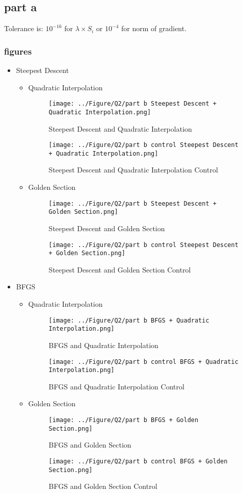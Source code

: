 \subsection{part a}
Tolerance is: $10^{-16}$ for $\lambda \times S_i$ or $10^{-4}$ for norm of gradient.
\subsubsection{figures}
\newpage
\begin{itemize}
	\item Steepest Descent
	\begin{itemize}
		\item Quadratic Interpolation
		\begin{figure}[H]
			\caption{Steepest Descent and Quadratic Interpolation}
			\centering
			\texttt{[image: ../Figure/Q2/part b Steepest Descent + Quadratic Interpolation.png]}
		\end{figure}
		\begin{figure}[H]
			\caption{Steepest Descent and Quadratic Interpolation Control}
			\centering
			\texttt{[image: ../Figure/Q2/part b control Steepest Descent + Quadratic Interpolation.png]}
		\end{figure}
		\item Golden Section
		\begin{figure}[H]
			\caption{Steepest Descent and Golden Section}
			\centering
			\texttt{[image: ../Figure/Q2/part b Steepest Descent + Golden Section.png]}
		\end{figure}
		\begin{figure}[H]
			\caption{Steepest Descent and Golden Section Control}
			\centering
			\texttt{[image: ../Figure/Q2/part b control Steepest Descent + Golden Section.png]}
		\end{figure}
	\end{itemize}
	\item BFGS
	\begin{itemize}
		\item Quadratic Interpolation
		\begin{figure}[H]
			\caption{BFGS and Quadratic Interpolation}
			\centering
			\texttt{[image: ../Figure/Q2/part b BFGS + Quadratic Interpolation.png]}
		\end{figure}
			\begin{figure}[H]
		\caption{BFGS and Quadratic Interpolation Control}
		\centering
		\texttt{[image: ../Figure/Q2/part b control BFGS + Quadratic Interpolation.png]}
	\end{figure}
		\item Golden Section
		\begin{figure}[H]
			\caption{BFGS and Golden Section}
			\centering
			\texttt{[image: ../Figure/Q2/part b BFGS + Golden Section.png]}
		\end{figure}
			\begin{figure}[H]
		\caption{BFGS and Golden Section Control}
		\centering
		\texttt{[image: ../Figure/Q2/part b control BFGS + Golden Section.png]}
	\end{figure}
	\end{itemize}
\end{itemize}
